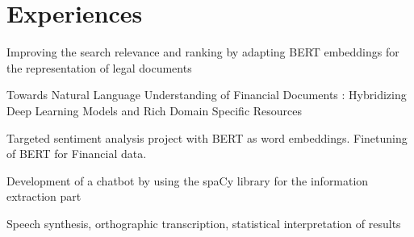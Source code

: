 \section{Experiences}

\vspace{\topsep}
\begin{tightemize}
\item Improving the search relevance and ranking by adapting BERT embeddings for the representation of legal documents
\end{tightemize}
\sectionsep

\vspace{\topsep}
\begin{tightemize}
\item Towards Natural Language Understanding of Financial Documents : Hybridizing Deep Learning Models and Rich Domain Specific Resources
\end{tightemize}
\sectionsep

\vspace{\topsep}
\begin{tightemize}
\item Targeted sentiment analysis project with BERT as word embeddings. Finetuning of BERT for Financial data.
\end{tightemize}
\sectionsep

\vspace{\topsep}
\begin{tightemize}
\item Development of a chatbot by using the spaCy library for the information extraction part
\end{tightemize}
\sectionsep

\vspace{\topsep}
\begin{tightemize}
\item Speech synthesis, orthographic transcription, statistical interpretation of results
\end{tightemize}
\sectionsep



